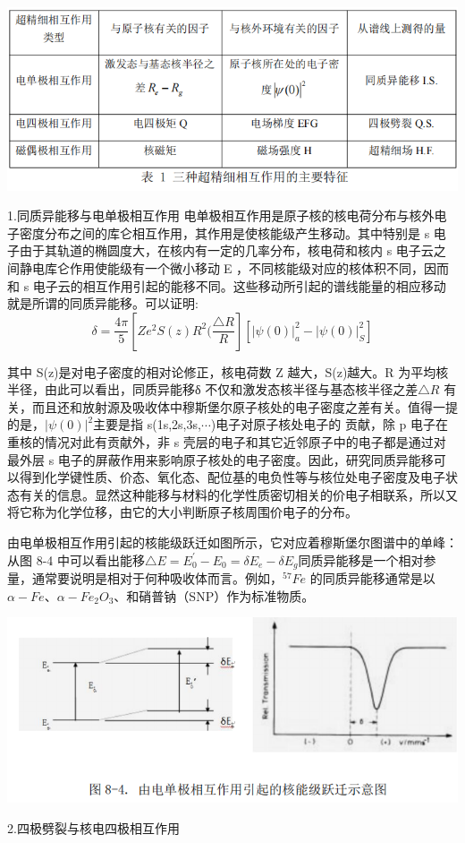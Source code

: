 \documentclass[hyperref]{ctexart}
\begin{document}
\begin{multicols}{2}
	\begin{center}\includegraphics[scale=0.3]{b1.png}\end{center}
	1.同质异能移与电单极相互作用
	电单极相互作用是原子核的核电荷分布与核外电子密度分布之间的库仑相互作用，其作用是使核能级产生移动。其中特别是 s 电子由于其轨道的椭圆度大，在核内有一定的几率分布，核电荷和核内 s 电子云之间静电库仑作用使能级有一个微小移动E ，不同核能级对应的核体积不同，因而和 s 电子云的相互作用引起的能移不同。这些移动所引起的谱线能量的相应移动就是所谓的同质异能移。可以证明:
	\begin{equation}
	\delta=\frac{4\pi}{5}[Ze^2S(z)R^2(\frac{\triangle R}{R}][{|\psi(0)|}_a^2-{|\psi(0)|}_S^2]
	\end{equation}

	其中 S(z)是对电子密度的相对论修正，核电荷数 Z 越大，S(z)越大。R 为平均核半径，由此可以看出，同质异能移δ 不仅和激发态核半径与基态核半径之差$\triangle R$ 有关，而且还和放射源及吸收体中穆斯堡尔原子核处的电子密度之差有关。值得一提的是，${|\psi(0)|}^2$主要是指 s(1s,2s,3s,$\cdots$)电子对原子核处电子的
贡献，除 p 电子在重核的情况对此有贡献外，非 s 壳层的电子和其它近邻原子中的电子都是通过对最外层 s 电子的屏蔽作用来影响原子核处的电子密度。因此，研究同质异能移可以得到化学键性质、价态、氧化态、配位基的电负性等与核位处电子密度及电子状态有关的信息。显然这种能移与材料的化学性质密切相关的价电子相联系，所以又将它称为化学位移，由它的大小判断原子核周围价电子的分布。

	由电单极相互作用引起的核能级跃迁如图所示，它对应着穆斯堡尔图谱中的单峰：从图 8-4 中可以看出能移$\triangle E=E_0^{\prime}-E_0=\delta E_e-\delta E_g$同质异能移是一个相对参量，通常要说明是相对于何种吸收体而言。例如，$^{57}Fe$ 的同质异能移通常是以$\alpha-Fe$、$\alpha-{Fe}_2O_3$、和硝普钠（SNP）作为标准物质。

	\begin{center}\includegraphics[scale=0.3]{t84.png}\end{center}
	2.四极劈裂与核电四极相互作用


\end{multicols}
\end{document}
